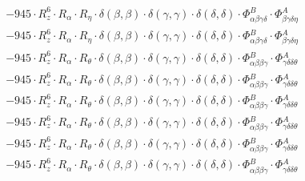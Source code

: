 \documentclass{article}
\begin{document}
\begin{subequations}
\begin{gather}
\begin{array}{c}
 \\[0.2em] 		 - 945 \cdot R_{z}^{6} \cdot R_{\alpha{}} \cdot R_{\eta{}} \cdot \delta{}\left(\beta{}, \beta{}\right) \cdot \delta{}\left(\gamma{}, \gamma{}\right) \cdot \delta{}\left(\delta{}, \delta{}\right) \cdot \Phi{}^{B}_{\alpha{}\beta{}\gamma{}\delta{}} \cdot \Phi{}^{A}_{\beta{}\gamma{}\delta{}\eta{}} 
 \\[0.2em] 		 - 945 \cdot R_{z}^{6} \cdot R_{\alpha{}} \cdot R_{\eta{}} \cdot \delta{}\left(\beta{}, \beta{}\right) \cdot \delta{}\left(\gamma{}, \gamma{}\right) \cdot \delta{}\left(\delta{}, \delta{}\right) \cdot \Phi{}^{B}_{\alpha{}\beta{}\gamma{}\delta{}} \cdot \Phi{}^{A}_{\beta{}\gamma{}\delta{}\eta{}} 
 \\[0.2em] 		 - 945 \cdot R_{z}^{6} \cdot R_{\alpha{}} \cdot R_{\theta{}} \cdot \delta{}\left(\beta{}, \beta{}\right) \cdot \delta{}\left(\gamma{}, \gamma{}\right) \cdot \delta{}\left(\delta{}, \delta{}\right) \cdot \Phi{}^{B}_{\alpha{}\beta{}\beta{}\gamma{}} \cdot \Phi{}^{A}_{\gamma{}\delta{}\delta{}\theta{}} 
 \\[0.2em] 		 - 945 \cdot R_{z}^{6} \cdot R_{\alpha{}} \cdot R_{\theta{}} \cdot \delta{}\left(\beta{}, \beta{}\right) \cdot \delta{}\left(\gamma{}, \gamma{}\right) \cdot \delta{}\left(\delta{}, \delta{}\right) \cdot \Phi{}^{B}_{\alpha{}\beta{}\beta{}\gamma{}} \cdot \Phi{}^{A}_{\gamma{}\delta{}\delta{}\theta{}} 
 \\[0.2em] 		 - 945 \cdot R_{z}^{6} \cdot R_{\alpha{}} \cdot R_{\theta{}} \cdot \delta{}\left(\beta{}, \beta{}\right) \cdot \delta{}\left(\gamma{}, \gamma{}\right) \cdot \delta{}\left(\delta{}, \delta{}\right) \cdot \Phi{}^{B}_{\alpha{}\beta{}\beta{}\gamma{}} \cdot \Phi{}^{A}_{\gamma{}\delta{}\delta{}\theta{}} 
 \\[0.2em] 		 - 945 \cdot R_{z}^{6} \cdot R_{\alpha{}} \cdot R_{\theta{}} \cdot \delta{}\left(\beta{}, \beta{}\right) \cdot \delta{}\left(\gamma{}, \gamma{}\right) \cdot \delta{}\left(\delta{}, \delta{}\right) \cdot \Phi{}^{B}_{\alpha{}\beta{}\beta{}\gamma{}} \cdot \Phi{}^{A}_{\gamma{}\delta{}\delta{}\theta{}} 
 \\[0.2em] 		 - 945 \cdot R_{z}^{6} \cdot R_{\alpha{}} \cdot R_{\theta{}} \cdot \delta{}\left(\beta{}, \beta{}\right) \cdot \delta{}\left(\gamma{}, \gamma{}\right) \cdot \delta{}\left(\delta{}, \delta{}\right) \cdot \Phi{}^{B}_{\alpha{}\beta{}\beta{}\gamma{}} \cdot \Phi{}^{A}_{\gamma{}\delta{}\delta{}\theta{}} 
 \\[0.2em] 		 - 945 \cdot R_{z}^{6} \cdot R_{\alpha{}} \cdot R_{\theta{}} \cdot \delta{}\left(\beta{}, \beta{}\right) \cdot \delta{}\left(\gamma{}, \gamma{}\right) \cdot \delta{}\left(\delta{}, \delta{}\right) \cdot \Phi{}^{B}_{\alpha{}\beta{}\beta{}\gamma{}} \cdot \Phi{}^{A}_{\gamma{}\delta{}\delta{}\theta{}} 

\end{array}
\end{gather}
\end{subequations}
\end{document}
